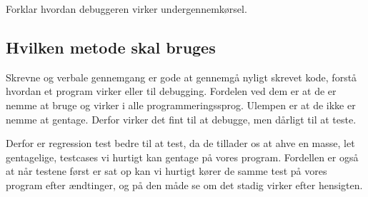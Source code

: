 \documentclass{article}
\begin{document}
Forklar hvordan debuggeren virker undergennemkørsel.

\subsection*{Hvilken metode skal bruges}
Skrevne og verbale gennemgang er gode at gennemgå nyligt skrevet kode, forstå hvordan et program virker eller til debugging.
Fordelen ved dem er at de er nemme at bruge og virker i alle programmeringssprog. 
Ulempen er at de ikke er nemme at gentage. Derfor virker det fint til at debugge, men dårligt til at teste. 

Derfor er regression test bedre til at test, da de tillader os at ahve en masse, let gentagelige, testcases vi hurtigt kan gentage på vores program. Fordellen er også at når testene først er sat op kan vi hurtigt kører de samme test på vores program efter ændtinger, og på den måde se om det stadig virker efter hensigten.
\end{document}
